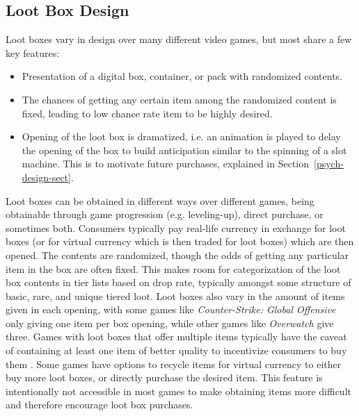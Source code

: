 \documentclass[11pt]{article}
\newcommand\genref[2]{#1~\ref{#2}}
\newcommand\sectref[1]{\genref{Section}{#1}}
\begin{document}
\subsection{Loot Box Design} \label{lootbox-design-sect}
Loot boxes vary in design over many different video games, but most share a few key features: 
\begin{itemize}
   \item Presentation of a digital box, container, or pack with randomized contents.
   \item The chances of getting any certain item among the randomized content is fixed, leading to low 
   chance rate item to be highly desired.
   \item Opening of the loot box is dramatized, i.e. an animation is played to delay the opening 
   of the box to build anticipation similar to the spinning of a slot machine. This is 
   to motivate future purchases, explained in  \sectref{psych-design-sect}.
\end{itemize}
Loot boxes can be obtained in different ways over different games, being 
obtainable through game progression (e.g. leveling-up), direct purchase, or sometimes both.
Consumers typically pay real-life currency in exchange for loot boxes (or for virtual
currency which is then traded for loot boxes) which are then opened. The contents are 
randomized, though the odds of getting any particular item in the box are often fixed. This
makes room for categorization of the loot box contents in tier lists based on drop rate, 
typically amongst some structure of basic, rare, and unique tiered loot. Loot boxes also vary in 
the amount of items given in each opening, with some games like \textit{Counter-Strike: Global
Offensive} only giving one item per box opening, while other games like \textit{Overwatch} give
three. Games with loot boxes that offer multiple items typically have the 
caveat of containing at least one item of better quality to incentivize consumers to buy them \cite{McCaffrey2019}.
Some games have options to recycle items for virtual currency to either buy more loot
boxes, or directly purchase the desired item. This feature is intentionally not accessible 
in most games to make obtaining items more difficult and therefore encourage loot box purchases. 
\end{document}

